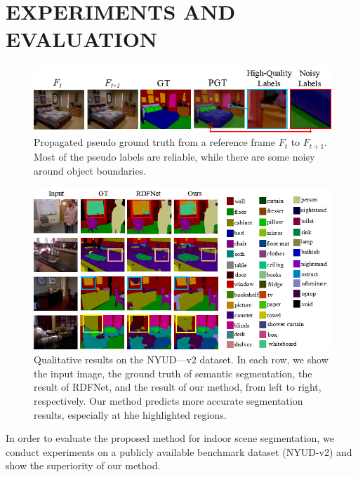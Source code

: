 \section{EXPERIMENTS AND EVALUATION}
\label{sec:exper}

\begin{figure}[t]
	\centering
	\includegraphics[width=\columnwidth]{figure/PGT.png}
	\caption{Propagated pseudo ground truth from a reference frame $F_t$ to $F_{t+1}$. Most of the pseudo labels are reliable, while there are some noisy around object boundaries.}
	\label{fig:PGT}
\end{figure}

\begin{figure}[!th]
	\centering
	\includegraphics[width=\columnwidth]{figure/Result.png}
	\caption{Qualitative results on the NYUD—v2 dataset. In each row, we show the input image, the ground truth of semantic segmentation, the result of RDFNet, and the result of our method, from left to right, respectively. Our method predicts more accurate segmentation results, especially at hhe highlighted regions.}
	\label{fig:VisResult}
\end{figure}

In order to evaluate the proposed method for indoor scene segmentation, we conduct experiments on a publicly available benchmark dataset (NYUD-v2) and show the superiority of our method.


